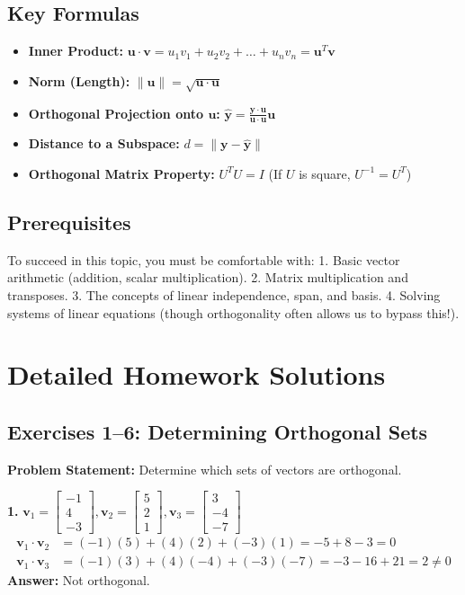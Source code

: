\documentclass[11pt, letterpaper]{article}
\theoremstyle{definition}
\theoremstyle{remark}
\begin{document}
\subsection{Key Formulas}
\begin{itemize}
    \item \textbf{Inner Product:} $\mathbf{u} \cdot \mathbf{v} = u_1v_1 + u_2v_2 + \dots + u_nv_n = \mathbf{u}^T \mathbf{v}$
    \item \textbf{Norm (Length):} $\|\mathbf{u}\| = \sqrt{\mathbf{u} \cdot \mathbf{u}}$
    \item \textbf{Orthogonal Projection onto $\mathbf{u}$:} $\hat{\mathbf{y}} = \frac{\mathbf{y} \cdot \mathbf{u}}{\mathbf{u} \cdot \mathbf{u}} \mathbf{u}$
    \item \textbf{Distance to a Subspace:} $d = \|\mathbf{y} - \hat{\mathbf{y}}\|$
    \item \textbf{Orthogonal Matrix Property:} $U^T U = I$ (If $U$ is square, $U^{-1} = U^T$)
\end{itemize}

\subsection{Prerequisites}
To succeed in this topic, you must be comfortable with:
1. Basic vector arithmetic (addition, scalar multiplication).
2. Matrix multiplication and transposes.
3. The concepts of linear independence, span, and basis.
4. Solving systems of linear equations (though orthogonality often allows us to bypass this!).

\newpage
\section{Detailed Homework Solutions}

\subsection{Exercises 1--6: Determining Orthogonal Sets}
\textbf{Problem Statement:} Determine which sets of vectors are orthogonal.

\textbf{1.} $\mathbf{v}_1 = \begin{bmatrix} -1 \\ 4 \\ -3 \end{bmatrix}, \mathbf{v}_2 = \begin{bmatrix} 5 \\ 2 \\ 1 \end{bmatrix}, \mathbf{v}_3 = \begin{bmatrix} 3 \\ -4 \\ -7 \end{bmatrix}$
\begin{align*}
    \mathbf{v}_1 \cdot \mathbf{v}_2 &= (-1)(5) + (4)(2) + (-3)(1) = -5 + 8 - 3 = 0 \\
    \mathbf{v}_1 \cdot \mathbf{v}_3 &= (-1)(3) + (4)(-4) + (-3)(-7) = -3 - 16 + 21 = 2 \neq 0
\end{align*}
\textbf{Answer:} Not orthogonal.
\end{document}
